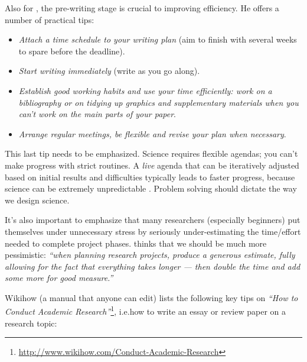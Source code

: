 \documentclass[graybox,envcountchap,sectrefs,UStrade]{svmono}
\begin{document}
Also for \citet{Creedy2008research}, the pre-writing stage is crucial to improving efficiency. He offers a number of practical tips:

\begin{itemize}
  \item \emph{Attach a time schedule to your writing plan} (aim to finish with several weeks to spare before the deadline).
  \item \emph{Start writing immediately} (write as you go along).
  \item \emph{Establish good working habits and use your time efficiently: work on a bibliography or on tidying up graphics and supplementary materials when you can't work on the main parts of your paper}.
  \item \emph{Arrange regular meetings, be flexible and revise your plan when necessary}.
\end{itemize}

This last tip needs to be emphasized. Science requires flexible agendas; you can't make progress with strict routines. A \emph{live} agenda that can be iteratively adjusted based on initial results and difficulties typically leads to faster progress, because science can be extremely unpredictable \citep{Crump2002}. Problem solving should dictate the way we design science.\par

It's also important to emphasize that many researchers (especially beginners) put themselves under unnecessary stress by seriously under-estimating the time/effort needed to complete project phases. \citet[p.22]{Creedy2008research} thinks that we should be much more pessimistic: \emph{``when planning research projects, produce a generous estimate, fully allowing for the fact that everything takes longer --- then double the time and add some more for good measure.''} \par

Wikihow (a manual that anyone can edit) lists the following key tips on \emph{``How to Conduct Academic Research''}\footnote{\url{http://www.wikihow.com/Conduct-Academic-Research}}, i.e.\@ how to write an essay or review paper on a research topic:
\end{document}
